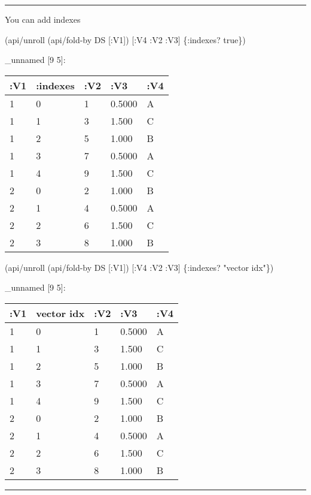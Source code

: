 \documentclass[]{article}
\newenvironment{Shaded}{\begin{snugshade}}{\end{snugshade}}
\newcommand{\StringTok}[1]{\textcolor[rgb]{0.31,0.60,0.02}{#1}}
\newcommand{\VariableTok}[1]{\textcolor[rgb]{0.00,0.00,0.00}{#1}}
\newcommand{\AttributeTok}[1]{\textcolor[rgb]{0.77,0.63,0.00}{#1}}
\newcommand{\NormalTok}[1]{#1}
\begin{document}
\begin{center}\rule{0.5\linewidth}{0.5pt}\end{center}

You can add indexes

\begin{Shaded}
\begin{Highlighting}[]
\NormalTok{(api/unroll (api/fold-by DS [}\AttributeTok{:V1}\NormalTok{]) [}\AttributeTok{:V4} \AttributeTok{:V2} \AttributeTok{:V3}\NormalTok{] \{}\AttributeTok{:indexes}\NormalTok{? }\VariableTok{true}\NormalTok{\})}
\end{Highlighting}
\end{Shaded}

\_unnamed {[}9 5{]}:

\begin{longtable}[]{@{}lllll@{}}
\toprule
:V1 & :indexes & :V2 & :V3 & :V4\tabularnewline
\midrule
\endhead
1 & 0 & 1 & 0.5000 & A\tabularnewline
1 & 1 & 3 & 1.500 & C\tabularnewline
1 & 2 & 5 & 1.000 & B\tabularnewline
1 & 3 & 7 & 0.5000 & A\tabularnewline
1 & 4 & 9 & 1.500 & C\tabularnewline
2 & 0 & 2 & 1.000 & B\tabularnewline
2 & 1 & 4 & 0.5000 & A\tabularnewline
2 & 2 & 6 & 1.500 & C\tabularnewline
2 & 3 & 8 & 1.000 & B\tabularnewline
\bottomrule
\end{longtable}

\begin{Shaded}
\begin{Highlighting}[]
\NormalTok{(api/unroll (api/fold-by DS [}\AttributeTok{:V1}\NormalTok{]) [}\AttributeTok{:V4} \AttributeTok{:V2} \AttributeTok{:V3}\NormalTok{] \{}\AttributeTok{:indexes}\NormalTok{? }\StringTok{"vector idx"}\NormalTok{\})}
\end{Highlighting}
\end{Shaded}

\_unnamed {[}9 5{]}:

\begin{longtable}[]{@{}lllll@{}}
\toprule
:V1 & vector idx & :V2 & :V3 & :V4\tabularnewline
\midrule
\endhead
1 & 0 & 1 & 0.5000 & A\tabularnewline
1 & 1 & 3 & 1.500 & C\tabularnewline
1 & 2 & 5 & 1.000 & B\tabularnewline
1 & 3 & 7 & 0.5000 & A\tabularnewline
1 & 4 & 9 & 1.500 & C\tabularnewline
2 & 0 & 2 & 1.000 & B\tabularnewline
2 & 1 & 4 & 0.5000 & A\tabularnewline
2 & 2 & 6 & 1.500 & C\tabularnewline
2 & 3 & 8 & 1.000 & B\tabularnewline
\bottomrule
\end{longtable}

\begin{center}\rule{0.5\linewidth}{0.5pt}\end{center}
\end{document}
